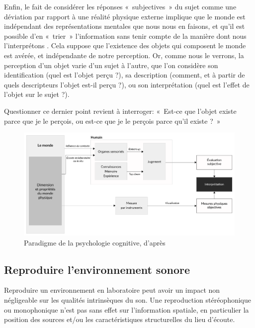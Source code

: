 Enfin, le fait de considérer les réponses «~subjectives~» du sujet comme une déviation par rapport à une réalité physique externe implique que le monde  est indépendant des représentations mentales que nous nous en faisons, et qu'il est possible d'en «~trier~» l'information sans tenir compte de la manière dont nous l'interprétons \citep{dubois2000categories}. Cela suppose que l'existence des objets qui composent le monde est avérée, et indépendante de notre perception. Or, comme nous le verrons, la perception d'un objet varie d'un sujet à l'autre, que l'on considère son identification (quel est l'objet perçu ?), sa description (comment, et à partir de quels descripteurs l'objet est-il perçu ?), ou son interprétation (quel est l'effet de l'objet sur le sujet ?). 

Questionner ce dernier point revient à interroger: «~Est-ce que l'objet existe parce que je le perçois, ou est-ce que je le perçois parce qu'il existe ?~»

\begin{figure}[t]
        \myfloatalign
        \includegraphics[width=\linewidth]{gfx/ch_3/paradigmepsychoco}
        \caption[Paradigme de la psychologie cognitive]{Paradigme de la psychologie cognitive, d'après \citep{maffiolo_caracterisation_1999}}\label{fig:paradigmePsychoCo}
\end{figure}

\subsection{Reproduire l'environnement sonore}
\label{sec:ch3_soundReproduction}

Reproduire un environnement en laboratoire peut avoir un impact non négligeable sur les qualités intrinsèques du son. Une reproduction stéréophonique ou monophonique n'est pas sans effet sur l'information spatiale, en particulier la position des sources et/ou les caractéristiques structurelles du lieu d'écoute.

